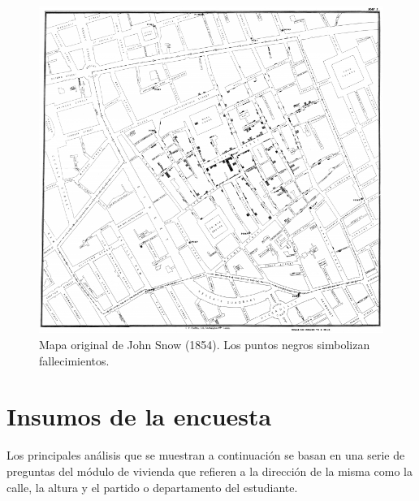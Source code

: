 \documentclass[
  letterpaper,
  DIV=11,
  numbers=noendperiod]{scrreprt}
\begin{document}
\begin{tcolorbox}
\begin{figure}[H]

{\centering \includegraphics{./Inputs/Images/snowmap-1854-768x729.png}

}

\caption{Mapa original de John Snow (1854). Los puntos negros simbolizan
fallecimientos.}

\end{figure}

\end{tcolorbox}

\hypertarget{insumos-de-la-encuesta}{%
\section{Insumos de la encuesta}\label{insumos-de-la-encuesta}}

Los principales análisis que se muestran a continuación se basan en una
serie de preguntas del módulo de vivienda que refieren a la dirección de
la misma como la calle, la altura y el partido o departamento del
estudiante.
\end{document}
